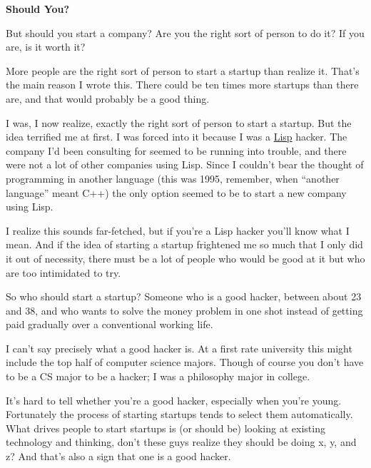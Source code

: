 \documentclass[12pt]{book}
\begin{document}
\textbf{Should You?}

But should you start a company? Are you the right sort of person to do
it? If you are, is it worth it?

More people are the right sort of person to start a startup than realize
it. That's the main reason I wrote this. There could be ten times more
startups than there are, and that would probably be a good thing.

I was, I now realize, exactly the right sort of person to start a
startup. But the idea terrified me at first. I was forced into it
because I was a \href{icad.html}{Lisp} hacker. The company I'd been
consulting for seemed to be running into trouble, and there were not a
lot of other companies using Lisp. Since I couldn't bear the thought of
programming in another language (this was 1995, remember, when ``another
language'' meant C++) the only option seemed to be to start a new
company using Lisp.

I realize this sounds far-fetched, but if you're a Lisp hacker you'll
know what I mean. And if the idea of starting a startup frightened me so
much that I only did it out of necessity, there must be a lot of people
who would be good at it but who are too intimidated to try.

So who should start a startup? Someone who is a good hacker, between
about 23 and 38, and who wants to solve the money problem in one shot
instead of getting paid gradually over a conventional working life.

I can't say precisely what a good hacker is. At a first rate university
this might include the top half of computer science majors. Though of
course you don't have to be a CS major to be a hacker; I was a
philosophy major in college.

It's hard to tell whether you're a good hacker, especially when you're
young. Fortunately the process of starting startups tends to select them
automatically. What drives people to start startups is (or should be)
looking at existing technology and thinking, don't these guys realize
they should be doing x, y, and z? And that's also a sign that one is a
good hacker.
\end{document}
